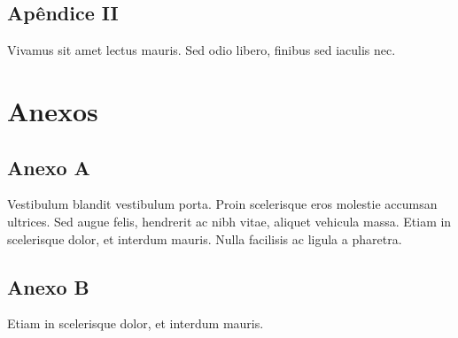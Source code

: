 \documentclass[book,A4paper,10pt,twoside,oldfontcommands]{memoir}\usepackage[]{graphicx}\usepackage[usenames,dvipsnames]{color}
\begin{document}
\section*{Apêndice II}

Vivamus sit amet lectus mauris. Sed odio libero, finibus sed iaculis
nec.


\chapter*{Anexos}
\renewcommand{\thefigure}{anexo\arabic{figure}}
\renewcommand{\thetable}{anexo\arabic{table}}



\section*{Anexo A}

Vestibulum blandit vestibulum porta. Proin scelerisque eros molestie
accumsan ultrices. Sed augue felis, hendrerit ac nibh vitae, aliquet
vehicula massa. Etiam in scelerisque dolor, et interdum mauris. Nulla
facilisis ac ligula a pharetra.

\section*{Anexo B}

Etiam in scelerisque dolor, et interdum mauris.
\end{document}
